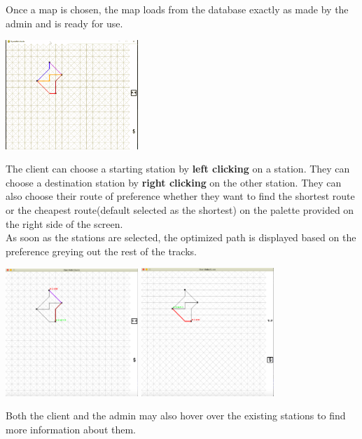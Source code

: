\documentclass[fontsize=11pt]{article}
\begin{document}
    Once a map is chosen, the map loads from the database exactly as made by the admin and is ready for use.\\
    \begin{center}
        \includegraphics[width = 5cm]{client sample map.png}\\
    \end{center}
    The client can choose a starting station by \textbf{left clicking} on a station. They can choose a destination station by \textbf{right clicking} on the other station. They can also choose their route of preference whether they want to find the shortest route or the cheapest route(default selected as the shortest) on the palette provided on the right side of the screen.\\
    As soon as the stations are selected, the optimized path is displayed based on the preference greying out the rest of the tracks.\\
    \begin{center}
        \includegraphics[width = 5cm]{client shortest route.png} \quad
        \includegraphics[width = 5cm]{client cheapest route.png}
    \end{center}
    Both the client and the admin may also hover over the existing stations to find more information about them.
\end{document}
